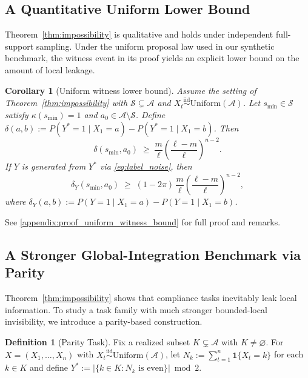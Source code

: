 \documentclass{article}
\theoremstyle{plain}
\newtheorem{corollary}[theorem]{Corollary}
\theoremstyle{definition}
\newtheorem{definition}[theorem]{Definition}
\theoremstyle{remark}
\begin{document}
\subsection{A Quantitative Uniform Lower Bound}
\label{sec:uniform_witness_bound}

Theorem~\ref{thm:impossibility} is qualitative and holds under independent
full-support sampling. Under the uniform proposal law used in our synthetic
benchmark, the witness event in its proof yields an explicit lower bound on the
amount of local leakage.

\begin{corollary}[Uniform witness lower bound]
\label{cor:uniform_witness_bound}
Assume the setting of Theorem~\ref{thm:impossibility} with
$\mathcal{S}\subsetneq\mathcal{A}$ and
$X_t \overset{\mathrm{iid}}{\sim} \mathrm{Uniform}(\mathcal{A})$.
Let $s_{\min}\in\mathcal{S}$ satisfy $\kappa(s_{\min})=1$ and
$a_0\in\mathcal{A}\setminus\mathcal{S}$. Define
$\delta(a,b) := P(Y^*\!=\!1\mid X_1\!=\!a)
              - P(Y^*\!=\!1\mid X_1\!=\!b)$.
Then
\begin{equation}
\label{eq:witness_clean}
\delta(s_{\min},a_0)
\;\ge\;
\frac{m}{\ell}
\!\left(\frac{\ell-m}{\ell}\right)^{\!n-2}.
\end{equation}
If $Y$ is generated from $Y^*$ via \eqref{eq:label_noise}, then
\begin{equation}
\label{eq:witness_noisy}
\delta_Y(s_{\min},a_0)
\;\ge\;
(1-2\pi)\,\frac{m}{\ell}
\!\left(\frac{\ell-m}{\ell}\right)^{\!n-2},
\end{equation}
where
$\delta_Y(a,b) := P(Y\!=\!1\mid X_1\!=\!a)
                 - P(Y\!=\!1\mid X_1\!=\!b)$.
\end{corollary}

See \ref{appendix:proof_uniform_witness_bound} for full proof and remarks.


\subsection{A Stronger Global-Integration Benchmark via Parity}
\label{sec:parity}

Theorem~\ref{thm:impossibility} shows that compliance tasks inevitably leak
local information. To study a task family with much stronger bounded-local
invisibility, we introduce a parity-based construction.

\begin{definition}[Parity Task]
\label{def:parity}
Fix a realized subset $K\subsetneq \mathcal{A}$ with
$K\neq\varnothing$. For $X=(X_1,\ldots,X_n)$ with
$X_t \overset{\mathrm{iid}}{\sim} \mathrm{Uniform}(\mathcal{A})$,
let $N_k := \sum_{t=1}^n \mathbf{1}\{X_t = k\}$ for each $k\in K$
and define
$Y^* := |\{k\in K : N_k \text{ is even}\}| \bmod 2$.
\end{definition}
\end{document}
